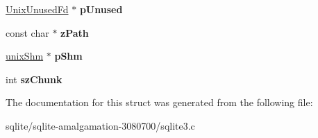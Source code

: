 \begin{DoxyCompactItemize}
\item 
\hypertarget{structunix_file_a3820ccead5805d2ea61ca1c752646852}{\hyperlink{struct_unix_unused_fd}{Unix\+Unused\+Fd} $\ast$ {\bfseries p\+Unused}}\label{structunix_file_a3820ccead5805d2ea61ca1c752646852}

\item 
\hypertarget{structunix_file_afc5eff0948d553308cf90a79d4a06f17}{const char $\ast$ {\bfseries z\+Path}}\label{structunix_file_afc5eff0948d553308cf90a79d4a06f17}

\item 
\hypertarget{structunix_file_a53c653bd73cdc6f518ecffe95062e91a}{\hyperlink{structunix_shm}{unix\+Shm} $\ast$ {\bfseries p\+Shm}}\label{structunix_file_a53c653bd73cdc6f518ecffe95062e91a}

\item 
\hypertarget{structunix_file_a5f6307d3446ce1b149df756c00c3bd2e}{int {\bfseries sz\+Chunk}}\label{structunix_file_a5f6307d3446ce1b149df756c00c3bd2e}

\end{DoxyCompactItemize}


The documentation for this struct was generated from the following file\+:\begin{DoxyCompactItemize}
\item 
sqlite/sqlite-\/amalgamation-\/3080700/sqlite3.\+c\end{DoxyCompactItemize}
